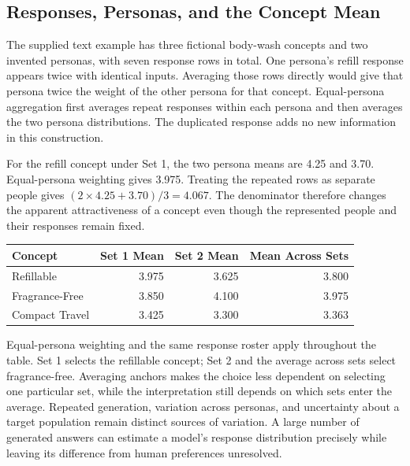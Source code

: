 \hypertarget{M05-responses-personas-and-the-concept-mean}{%
\subsection{Responses, Personas, and the Concept
Mean}\label{M05-responses-personas-and-the-concept-mean}}

\noindent \noindent The supplied text example has three fictional body-wash
concepts and two invented personas, with seven response rows in total.
One persona's refill response appears twice with identical inputs.
Averaging those rows directly would give that persona twice the weight
of the other persona for that concept. Equal-persona aggregation first
averages repeat responses within each persona and then averages the two
persona distributions. The duplicated response adds no new information
in this construction.

For the refill concept under Set 1, the two persona means are 4.25 and
3.70. Equal-persona weighting gives 3.975. Treating the repeated rows as
separate people gives \((2\times4.25+3.70)/3=4.067\). The denominator
therefore changes the apparent attractiveness of a concept even though
the represented people and their responses remain fixed.

\begin{table}[H]
\centering\small
\begin{tabular}{@{}lrrr@{}}
\toprule
Concept & Set 1 Mean & Set 2 Mean & Mean Across Sets \\
\midrule

Refillable & 3.975 & 3.625 & 3.800 \\
Fragrance-Free & 3.850 & 4.100 & 3.975 \\
Compact Travel & 3.425 & 3.300 & 3.363 \\
\bottomrule
\end{tabular}
\end{table}

Equal-persona weighting and the same response roster apply throughout
the table. Set 1 selects the refillable concept; Set 2 and the average
across sets select fragrance-free. Averaging anchors makes the choice
less dependent on selecting one particular set, while the interpretation
still depends on which sets enter the average. Repeated generation,
variation across personas, and uncertainty about a target population
remain distinct sources of variation. A large number of generated
answers can estimate a model's response distribution precisely while
leaving its difference from human preferences unresolved.

